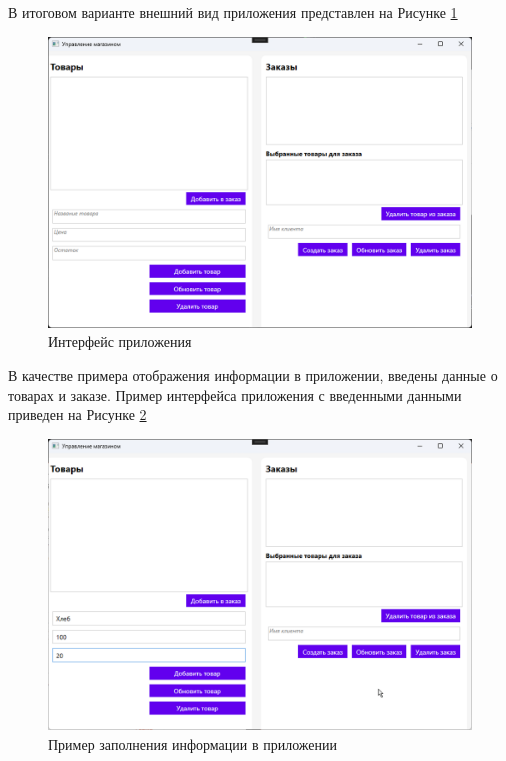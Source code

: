 \documentclass[12pt]{article}
\begin{document}
В итоговом варианте внешний вид приложения представлен на Рисунке \ref{fig:demo1}

\begin{figure}[ht]
	\centering
	\includegraphics[width=1.0\textwidth]{fig/image 26.png}
	\caption{Интерфейс приложения}
	\label{fig:demo1}
\end{figure}

\pagebreak

В качестве примера отображения информации в приложении, введены данные о товарах и заказе. Пример интерфейса приложения с введенными данными приведен на Рисунке \ref{fig:demo2}

\begin{figure}[ht]
	\centering
	\includegraphics[width=1.0\textwidth]{fig/image 27.png}
	\caption{Пример заполнения информации в приложении}
	\label{fig:demo2}
\end{figure}
\end{document}
